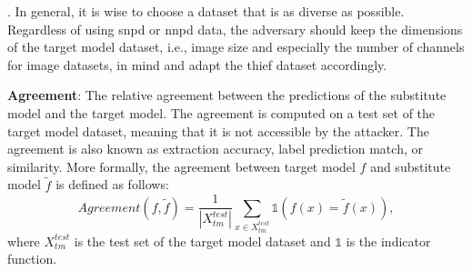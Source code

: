 \cite{pal2020activethief}. In general, it is wise to choose a dataset that is as diverse as possible. Regardless of using \gls{snpd} or \gls{nnpd} data, the adversary should keep the
dimensions of the target model dataset, i.e., image size and especially the number of channels for image datasets, in mind and adapt the thief dataset accordingly. \par
\textbf{Agreement}: The relative agreement between the predictions of the substitute model and the target model. The agreement is computed on a test set of the target 
model dataset, meaning that it is not accessible by the attacker. The agreement is also known as extraction accuracy, label prediction match, or similarity. More formally,
the agreement between target model $f$ and substitute model $\tilde{f}$ is defined as follows:
\begin{equation}
    Agreement(f,\tilde{f}) = \frac{1}{|X_{tm}^{test}|} \sum_{x \in X_{tm}^{test}} \mathds{1}(f(x) = \tilde{f}(x)),
\end{equation}
where $X_{tm}^{test}$ is the test set of the target model dataset and $\mathds{1}$ is the indicator function. \par




